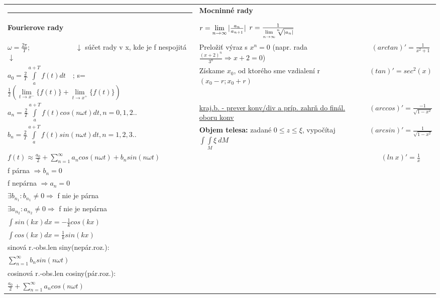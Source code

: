 \documentclass[8pt]{extarticle}
\begin{document}
\begin{tabular}{l|l|c}
\rule{72mm}{0.2pt} & \textbf{Mocninné rady} & \\
\textbf{Fourierove rady} & $r=\lim\limits_{n\rightarrow\infty}\arrowvert{}\frac{a_n}{a_{n+1}}\arrowvert{}$ \hspace{10mm} $r=\frac{1}{\lim\limits_{n\rightarrow\infty}\sqrt[\leftroot{4} \uproot{2} n]{\arrowvert{}a_n\arrowvert{}}}$& \\

$\omega = \frac{2\pi}{T}$;~~~~~~~~~~~~~$\downarrow$ súčet rady v x, kde je f nespojitá $\downarrow$ & Preložiť výraz s $x^n = 0$ (napr. rada $\frac{(x+2)^n}{3^n}\Rightarrow x+2=0$) & $(arctan)'=\frac{1}{x^2+1}$\\

$a_0 = \frac{2}{T}\int\limits_a^{a+T} f(t)dt$~~; s=$\frac{1}{2}(\lim\limits_{t\rightarrow x^-}\{f(t)\}+\lim\limits_{t\rightarrow x^+}\{f(t)\})$ & Získame $x_0$, od ktorého sme vzdialení r $(x_0-r;x_0+r)$ & $(tan)'=sec^2(x)$  \\

$a_n = \frac{2}{T}\int\limits_a^{a+T} f(t)cos(n\omega t)dt , n = 0,1,2..$ & \underline{kraj.b. - prever konv/div a príp. zahrň do finál. oboru konv} & $(arccos)'=\frac{-1}{\sqrt{1-x^2}}$ \\

$b_n = \frac{2}{T}\int\limits_a^{a+T} f(t)sin(n\omega t)dt , n = 1,2,3..$ & \textbf{Objem telesa:} zadané $0\le z \le \xi$, vypočítaj $\int\int\limits_M \xi~dM$ & $(arcsin)'=\frac{1}{\sqrt{1-x^2}}$ \\

$f(t) \approx \frac{a_0}{2} + \sum\limits_{n=1}^\infty a_n cos(n\omega t) + b_n sin(n\omega t) $ &  & $(ln~x)'=\frac{1}{x}$ \\

f párna $\Rightarrow b_n = 0$ & \\

f nepárna $\Rightarrow a_n = 0$ & \\

$\exists b_{n_1} : b_{n_1} \ne 0 \Rightarrow$
f nie je párna & \\

$\exists a_{n_2} : a_{n_2} \ne 0 \Rightarrow$
f nie je nepárna & \\

$\int sin(kx)dx = -\frac{1}{k} cos(kx)$ & \\

$\int cos(kx)dx = \frac{1}{k} sin(kx)$ & \\

sinová r.-obs.len siny(nepár.roz.): & \\
$\sum\limits_{n=1}^\infty b_n sin(n\omega t)$ & \\
cosinová r.-obs.len cosiny(pár.roz.): & \\
$\frac{a_0}{2}  +\sum\limits_{n=1}^\infty a_n cos(n\omega t)$ & & \\


\end{tabular}
\end{document}

